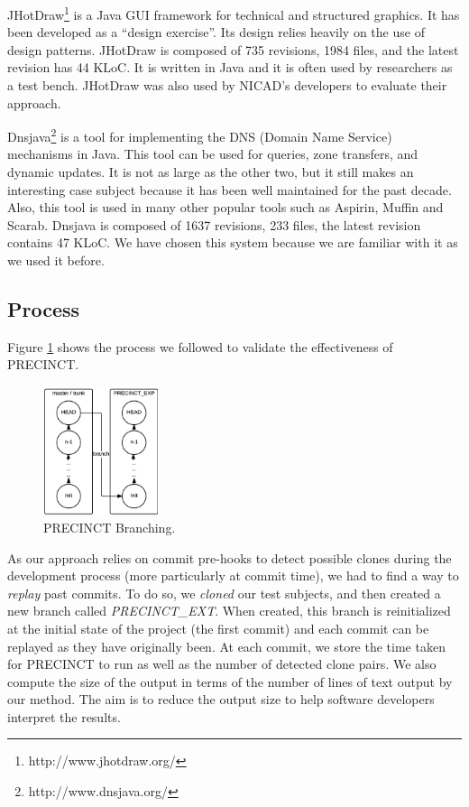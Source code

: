 \documentclass[conference]{IEEEtran}
\begin{document}
JHotDraw\footnote{http://www.jhotdraw.org/} is a Java GUI framework for technical and structured graphics.
It has been developed as a ``design exercise''. Its design relies heavily on the use of design patterns. JHotDraw is composed of 735 revisions, 1984 files, and the latest revision has 44 KLoC. It is written in Java and it is often used by researchers as a test bench. JHotDraw was also used by NICAD's developers to evaluate their approach.

Dnsjava\footnote{http://www.dnsjava.org/} is a tool for implementing the DNS (Domain Name Service) mechanisms in Java.
This tool can be used for queries, zone transfers, and dynamic updates.
It is not as large as the other two, but it still makes an interesting case subject because it has been well maintained for the past decade. Also, this tool is used in many other popular tools such as Aspirin, Muffin and
Scarab. Dnsjava is composed of 1637 revisions, 233 files, the latest revision contains 47 KLoC.
We have chosen this system because we are familiar with it as we used it before\cite{Nayrolles2015c}.

\subsection{Process}
\label{sub:Process}


Figure \ref{fig:precinct-branching} shows the process we followed to validate the effectiveness of PRECINCT.

\begin{figure}
  \centering
    \includegraphics[width=0.3\textwidth]{media/branch.png}
    \caption{PRECINCT Branching.\label{fig:precinct-branching}}
\end{figure}

As our approach relies on commit pre-hooks to detect possible clones during the development process (more particularly at commit time), we had to find a way to \textit{replay} past commits. To do so, we  \textit{cloned} our test subjects, and then created a new branch called \textit{PRECINCT\_EXT}.
When created, this branch is reinitialized at the initial state of the project (the first commit) and each commit can be replayed as they have originally been. At each commit, we store the time taken for PRECINCT to run as well as the number of detected clone pairs. We also compute the size of the output in terms of the number of lines of text output by our method. The aim is to reduce the output size to help software developers interpret the results.
\end{document}
